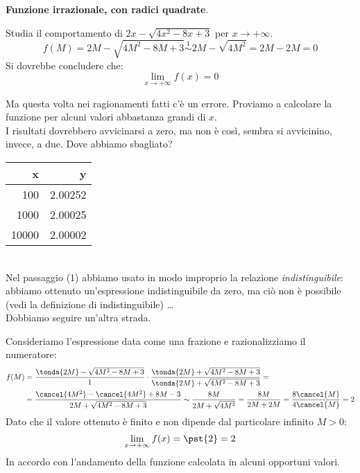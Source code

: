 \begin{esempio}
\textbf{Funzione irrazionale, con radici quadrate}.

Studia il comportamento di \(2x-\sqrt{4x^2-8x+3}\) per \(x \to +\infty\).
\[
f(M) = 2M-\sqrt{4M^2-8M+3} \stackrel{1}{\sim} 
  2M-\sqrt{4M^2} =
  2M-2M = 0
\]
Si dovrebbe concludere che:
\[\lim_{x \to +\infty} f(x) = 0\]
\begin{minipage}{.59\textwidth}
Ma questa volta nei ragionamenti fatti c'è un errore. Proviamo a calcolare 
la funzione per alcuni valori abbastanza grandi di \(x\).\\
I risultati dovrebbero avvicinarsi a zero, ma non è così, sembra si 
avvicinino, invece, a due. Dove abbiamo sbagliato?
\end{minipage}
\begin{minipage}{.39\textwidth}
\begin{center}
\begin{tabular}{r|r}
x & y\\\hline
100 & 2.00252 \\
1000 & 2.00025 \\
10000 & 2.00002 \\
\end{tabular}
\end{center}
\end{minipage}\\

Nel passaggio (1) abbiamo usato in modo improprio la relazione 
\emph{indistinguibile}: 
abbiamo ottenuto un'espressione indistinguibile da zero, ma ciò non è 
possibile (vedi la definizione di indistinguibile) \dots \\
Dobbiamo seguire un'altra strada.

Consideriamo l'espressione data come una frazione e razionalizziamo il 
numeratore:
\begin{align*}
f(M) &= \frac{\tonda{2M}-\sqrt{4M^2-8M+3}}{1} \cdot 
\frac{\tonda{2M}+\sqrt{4M^2-8M+3}}{\tonda{2M}+\sqrt{4M^2-8M+3}}=\\
&=\frac{\cancel{4M^2}-\cancel{4M^2}+8M-3}{2M+\sqrt{4M^2-8M+3}} \sim
\frac{8M}{2M+\sqrt{4M^2}} = \frac{8M}{2M+2M}=
   \frac{8\cancel{M}}{4\cancel{M}} = 2
\end{align*}
Dato che il valore ottenuto è finito e non dipende dal particolare infinito 
\(M > 0\):
\[\lim_{x \to +\infty} f(x) = \pst{2} = 2\]
In accordo con l'andamento della funzione calcolata in alcuni opportuni 
valori.
\end{esempio}

